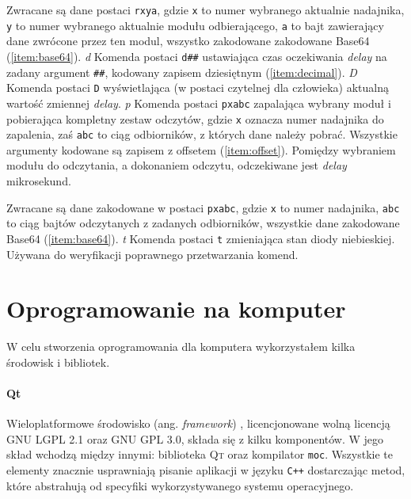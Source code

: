Zwracane są dane postaci \texttt{rxya}, gdzie \texttt{x} to numer wybranego aktualnie nadajnika, \texttt{y} to numer wybranego aktualnie modułu odbierającego, \texttt{a} to bajt zawierający dane zwrócone przez ten modul, wszystko zakodowane zakodowane Base64 (\ref{item:base64}).
\newline
\newline
\textsl{d}
Komenda postaci \texttt{d\#\#} ustawiająca czas oczekiwania \textsl{delay} na zadany argument \texttt{\#\#}, kodowany zapisem dziesiętnym (\ref{item:decimal}).
\newline
\newline
\textsl{D}
Komenda postaci \texttt{D} wyświetlająca (w postaci czytelnej dla człowieka) aktualną wartość zmiennej \textsl{delay}.
\newline
\newline
\textsl{p}
Komenda postaci \texttt{pxabc} zapalająca wybrany moduł i pobierająca kompletny zestaw odczytów, gdzie \texttt{x} oznacza numer nadajnika do zapalenia, zaś \texttt{abc} to ciąg odbiorników, z których dane należy pobrać. Wszystkie argumenty kodowane są zapisem z offsetem (\ref{item:offset}). Pomiędzy wybraniem modułu do odczytania, a dokonaniem odczytu, odczekiwane jest \textsl{delay} mikrosekund.

Zwracane są dane zakodowane w postaci \texttt{pxabc}, gdzie \texttt{x} to numer nadajnika, \texttt{abc} to ciąg bajtów odczytanych z zadanych odbiorników, wszystkie dane zakodowane Base64 (\ref{item:base64}).
\newline
\newline
\textsl{t}
Komenda postaci \texttt{t} zmieniająca stan diody niebieskiej. Używana do weryfikacji poprawnego przetwarzania komend.

\section{Oprogramowanie na komputer}
W celu stworzenia oprogramowania dla komputera wykorzystałem kilka środowisk i bibliotek.

\paragraph{Qt}
Wieloplatformowe środowisko (ang. \textsl{framework}) , licencjonowane wolną licencją \textsc{GNU LGPL 2.1} oraz \textsc{GNU GPL 3.0}, składa się z kilku komponentów.
W jego skład wchodzą między innymi: biblioteka \textsc{Qt} oraz kompilator \verb|moc|.
Wszystkie te elementy znacznie usprawniają pisanie aplikacji w języku \verb|C++| dostarczając metod, które abstrahują od specyfiki wykorzystywanego systemu operacyjnego.

